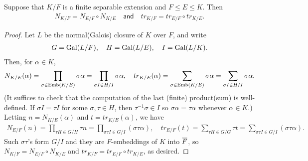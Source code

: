 \begin{prop}
    Suppose that $K/F$ is a finite separable extension and $F\leq E\leq K$.
    Then
    \begin{align*}
        N_{K/F}=N_{E/F}\circ N_{K/E}\quad\textsf{and}\quad tr_{K/F}=tr_{E/F}\circ tr_{K/E}.
    \end{align*}
\end{prop}
\begin{proof}
    Let $L$ be the normal(Galois) closure of $K$ over $F$, and write
    \begin{align*}
        G={\textrm{Gal}({L/F})},\quad H={\textrm{Gal}({L/E})},\quad I={\textrm{Gal}({L/K})}.
    \end{align*}
    Then, for $\alpha\in K$,
    \begin{align*}
        N_{K/E}(\alpha)=\prod_{\sigma\in{\textrm{Emb}({K/E})}}\sigma\alpha=\prod_{\sigma I\in H/I}\sigma\alpha,\quad
        tr_{K/E}(\alpha)=\sum_{\sigma\in{\textrm{Emb}({K/E})}}\sigma\alpha=\sum_{\sigma I\in H/I}\sigma\alpha.
    \end{align*}
    (It suffices to check that the computation of the last (finite) product(sum) is well-defined.
    If $\sigma I=\tau I$ for some $\sigma, \tau\in H$, then $\tau^{-1}\sigma\in I$ so $\sigma\alpha=\tau\alpha$ whenever $\alpha\in K$.)
    Letting $n=N_{K/E}(\alpha)$ and $t=tr_{K/E}(\alpha)$, we have
    \begin{align*}
        N_{E/F}(n)=\prod_{\tau H\in G/H} \tau n=\prod_{\sigma\tau I\in G/I}(\sigma\tau\alpha),\quad
        tr_{E/F}(t)=\sum_{\tau H\in G/G} \tau t=\sum_{\sigma\tau I\in G/I}(\sigma\tau\alpha).
    \end{align*}
    Such $\sigma\tau$'s form $G/I$ and they are $F$-embeddings of $K$ into $\overline{F}$, so $N_{K/F}=N_{E/F}\circ N_{K/E}$ and $tr_{K/F}=tr_{E/F}\circ tr_{K/E}$, as desired.
\end{proof}